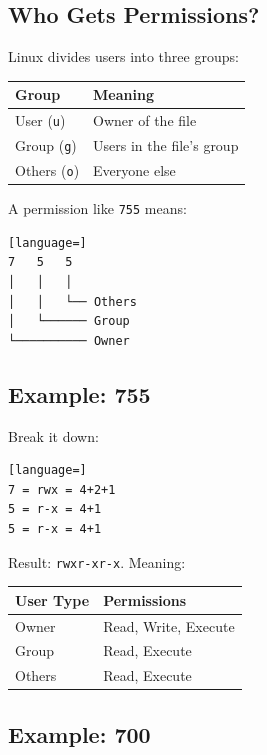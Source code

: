 \documentclass[11pt,a4paper]{article}
\begin{document}
\subsection{Who Gets Permissions?}

Linux divides users into three groups:

\begin{center}
\small
\begin{tabular}{@{}l l@{}}
\toprule
\rowcolor{tablehead}\bfseries Group & \bfseries Meaning \\
\midrule
User (\texttt{u})   & Owner of the file \\
Group (\texttt{g})  & Users in the file's group \\
Others (\texttt{o}) & Everyone else \\
\bottomrule
\end{tabular}
\end{center}

A permission like \lstinline|755| means:

\begin{lstlisting}[language=]
7   5   5
│   │   │
│   │   └── Others
│   └────── Group
└────────── Owner
\end{lstlisting}

\subsection{Example: 755}

Break it down:

\begin{lstlisting}[language=]
7 = rwx = 4+2+1
5 = r-x = 4+1
5 = r-x = 4+1
\end{lstlisting}

Result: \lstinline|rwxr-xr-x|. Meaning:

\begin{center}
\small
\begin{tabular}{@{}l l@{}}
\toprule
\rowcolor{tablehead}\bfseries User Type & \bfseries Permissions \\
\midrule
Owner  & Read, Write, Execute \\
Group  & Read, Execute \\
Others & Read, Execute \\
\bottomrule
\end{tabular}
\end{center}

\subsection{Example: 700}
\end{document}
